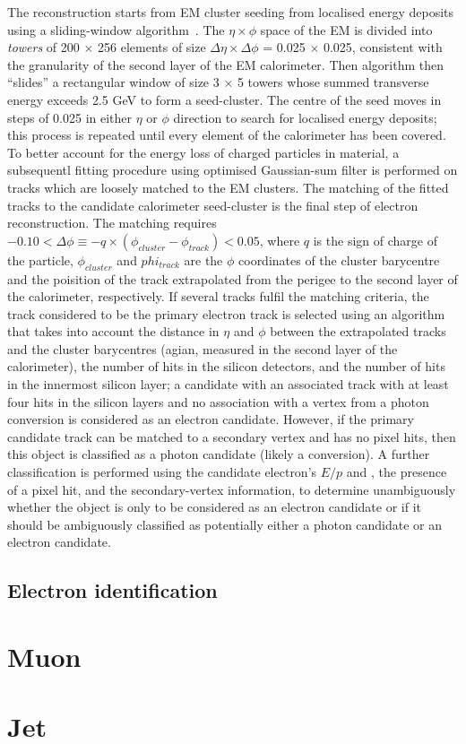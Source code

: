 The reconstruction starts from EM cluster seeding from localised energy deposits 
using a sliding-window algorithm~\cite{sliding-window}.
The $\eta \times \phi$ space of the EM is divided into \textit{towers} of 200 $\times$ 256
elements of size $\Delta\eta \times \Delta\phi$ = 0.025 $\times$ 0.025, consistent with the
granularity of the second layer of the EM calorimeter. Then algorithm then ``slides'' a rectangular
window of size 3 $\times$ 5 towers whose summed transverse energy exceeds 2.5 GeV to form a seed-cluster.
The centre of the seed moves in steps of 0.025 in either $\eta$ or $\phi$ direction to search for localised
energy deposits; this process is repeated until every element of the calorimeter has been covered.
To better account for the energy loss of charged particles in material, a subsequentl fitting procedure
using optimised Gaussian-sum filter \cite{ATLAS-CONF-2012-047} is performed on tracks which are loosely 
matched to the EM clusters. The matching of the fitted tracks to the candidate calorimeter seed-cluster
is the final step of electron reconstruction. 
The matching requires $-0.10 < \Delta\phi \equiv -q \times (\phi_{cluster} - \phi_{track}) < 0.05$, 
where $q$ is the sign of charge of the particle, $\phi_{cluster}$ and $phi_{track}$ are the 
$\phi$ coordinates of the cluster barycentre and the poisition of the track extrapolated from the 
perigee to the second layer of the calorimeter, respectively. 
If several tracks fulfil the matching criteria, the track considered to
be the primary electron track is selected using an algorithm that takes into account the distance in $\eta$
and $\phi$ between the extrapolated tracks and the cluster barycentres (agian, measured in the second layer of the
calorimeter), 
the number of hits in the silicon detectors, 
and the number of hits in the innermost silicon layer; 
a candidate with an associated track with at least four hits in the silicon layers and no association
with a vertex from a photon conversion is considered as an electron candidate. 
However, if the primary candidate track can be matched to a secondary vertex and has no pixel hits, 
then this object is classified as a photon candidate (likely a conversion). 
A further classification is performed using the candidate electron’s $E/p$ and \pt, 
the presence of a pixel hit, and the secondary-vertex information, to determine
unambiguously whether the object is only to be considered as an electron candidate or if it should be
ambiguously classified as potentially either a photon candidate or an electron candidate.

\subsection{Electron identification}



\section{Muon}
\section{Jet}
